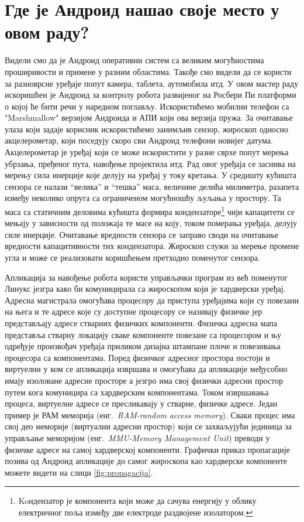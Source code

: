 \documentclass[12pt,oneside]{memoir}
\theoremstyle{remark}
\begin{document}
\section{Где је Андроид нашао своје место у овом раду?}
Видели смо да је Андроид оперативни систем са великим могућностима проширивости и примене у разним областима. Такође смо видели да се користи за разноврсне уређаје попут камера, таблета, аутомобила итд. У овом мастер раду искоришћен је Андроид за контролу робота развијеног на Росбери Пи платформи о којој ће бити речи у наредном поглављу. 
Искористићемо мобилни телефон са "Marshmallow" верзијом Андроида и АПИ који ова верзија пружа. За очитавање улаза који задаје корисник искористићемо занимљив сензор,  жироскоп односно акцелерометар, који поседују скоро сви Андроид телефони новијег датума. Акцелерометар је уређај који се може искористити у разне сврхе попут мерења убрзања, пређеног пута, навођење пројектила итд. Рад овог уређаја се заснива на мерењу сила инерције које делују на уређај у току кретања. У средишту кућишта сензора се налази \enquote{велика} и \enquote{тешка} маса, величине делића милиметра, разапета између неколико опруга са ограниченом могућношћу љуљања у простору. Та маса са статичним деловима кућишта формира кондензаторе\footnote{Koндензатор је компонента који може да сачува енергију у облику електричног поља између две електроде раздвојене изолатором.} чији капацитети се мењају у зависности од положаја те масе на коју, током померања уређаја, делују силе инерције. Очитавање вредности сензора се заправо своди на очитавање вредности капацитивности тих кондензатора. Жироскоп служи за мерење промене угла и може се реализовати коришћењем претходно поменутог сензора.

Апликација за навођење робота користи управљачки програм из већ поменутог Линукс језгра како би комуницирала са жироскопом који је хардверски уређај. Адресна магистрала омогућава процесору да приступа уређајима који су повезани на њега и те адресе које су доступне процесору се називају физичке јер представљају адресе стварних физичких компоненти. Физичка адресна мапа представља  стварну локацију сваке компоненте повезане са процесором и њу одређује произвођач уређаја приликом дизајна штампане плоче и повезивања процесора са компонентама. Поред физичког адресног простора постоји и виртуелни у ком се апликација извршава и омогућава да апликације међусобно имају изоловане адресне просторе а језгро има свој физички адресни простор путем кога комуницира са хардверским компонентама. Током извршавања процеса, виртуелне адресе се пресликавају у стварне, физичке адресе. Један пример је РАМ меморија (енг.~{\em RAM-random access memory}). Сваки процес има свој део меморије (виртуални адресни простор) који се захваљујући јединица за управљање меморијом (енг.~{\em MMU-Memory Management Unit}) преводи у физичке адресе на самој хардверској компоненти. Графички приказ пропагације позива од Андроид апликације до самог жироскопа као хардверске компоненте можете видети на слици \ref{fig:propagacija}.
\end{document}
